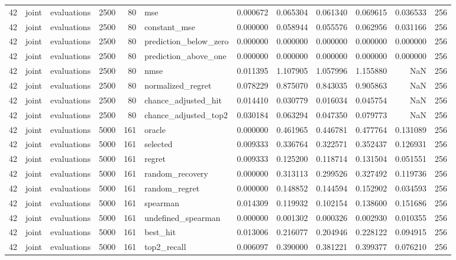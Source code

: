 \begin{tabular}{rllrrlrrrrrr}
42 & joint & evaluations & 2500 & 80 & mse & 0.000672 & 0.065304 & 0.061340 & 0.069615 & 0.036533 & 256 \\
42 & joint & evaluations & 2500 & 80 & constant_mse & 0.000000 & 0.058944 & 0.055576 & 0.062956 & 0.031166 & 256 \\
42 & joint & evaluations & 2500 & 80 & prediction_below_zero & 0.000000 & 0.000000 & 0.000000 & 0.000000 & 0.000000 & 256 \\
42 & joint & evaluations & 2500 & 80 & prediction_above_one & 0.000000 & 0.000000 & 0.000000 & 0.000000 & 0.000000 & 256 \\
42 & joint & evaluations & 2500 & 80 & nmse & 0.011395 & 1.107905 & 1.057996 & 1.155880 & NaN & 256 \\
42 & joint & evaluations & 2500 & 80 & normalized_regret & 0.078229 & 0.875070 & 0.843035 & 0.905863 & NaN & 256 \\
42 & joint & evaluations & 2500 & 80 & chance_adjusted_hit & 0.014410 & 0.030779 & 0.016034 & 0.045754 & NaN & 256 \\
42 & joint & evaluations & 2500 & 80 & chance_adjusted_top2 & 0.030184 & 0.063294 & 0.047350 & 0.079773 & NaN & 256 \\
42 & joint & evaluations & 5000 & 161 & oracle & 0.000000 & 0.461965 & 0.446781 & 0.477764 & 0.131089 & 256 \\
42 & joint & evaluations & 5000 & 161 & selected & 0.009333 & 0.336764 & 0.322571 & 0.352437 & 0.126931 & 256 \\
42 & joint & evaluations & 5000 & 161 & regret & 0.009333 & 0.125200 & 0.118714 & 0.131504 & 0.051551 & 256 \\
42 & joint & evaluations & 5000 & 161 & random_recovery & 0.000000 & 0.313113 & 0.299526 & 0.327492 & 0.119736 & 256 \\
42 & joint & evaluations & 5000 & 161 & random_regret & 0.000000 & 0.148852 & 0.144594 & 0.152902 & 0.034593 & 256 \\
42 & joint & evaluations & 5000 & 161 & spearman & 0.014309 & 0.119932 & 0.102154 & 0.138600 & 0.151686 & 256 \\
42 & joint & evaluations & 5000 & 161 & undefined_spearman & 0.000000 & 0.001302 & 0.000326 & 0.002930 & 0.010355 & 256 \\
42 & joint & evaluations & 5000 & 161 & best_hit & 0.013006 & 0.216077 & 0.204946 & 0.228122 & 0.094915 & 256 \\
42 & joint & evaluations & 5000 & 161 & top2_recall & 0.006097 & 0.390000 & 0.381221 & 0.399377 & 0.076210 & 256 \\

\end{tabular}
